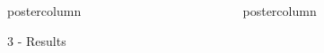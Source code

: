 \documentclass{beamer}
\newlength{\columnheight}
\begin{document}
\begin{frame}
\begin{columns}
\begin{column}{.499\textwidth}
\begin{beamercolorbox}[center]{postercolumn}
\begin{minipage}{.98\textwidth}
{\begin{myblock}{3 - Results}
\begin{figure}
\begin{minipage}{0.99\textwidth}
\begin{minipage}[t]{0.49\textwidth}
				\label{fig:ML5}
			\end{minipage}	
		\end{minipage}
	\end{figure}





\end{myblock}				

		}\end{minipage}\end{beamercolorbox}
	\end{column}
	
	\begin{column}{.249\textwidth}
		\begin{beamercolorbox}[center]{postercolumn}
			\begin{minipage}{.98\textwidth}  %
				\parbox[t][\columnheight]{\textwidth}{ %

}
\end{minipage}
\end{beamercolorbox}
\end{column}
\end{columns}
\end{frame}
\end{document}
